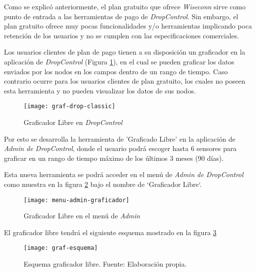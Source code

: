 Como se explicó anteriormente, el plan gratuito que ofrece \textit{Wiseconn} sirve como punto de entrada a las herramientas
de pago de \textit{DropControl}. Sin embargo, el plan gratuito ofrece muy pocas funcionalidades y/o herramientas
implicando poca retención de los usuarios y no se cumplen con las especificaciones comerciales.

Los usuarios clientes de plan de pago tienen a su disposición un graficador en la aplicación de \textit{DropControl} (Figura \ref{fig:graf-drop-classic}), en el cual
se pueden graficar los datos enviados por los nodos en los campos dentro de un rango de tiempo.
Caso contrario ocurre para los usuarios clientes de plan gratuito, los cuales no poseen esta herramienta y
no pueden visualizar los datos de sus nodos.

\begin{figure}[H]
	\centering
	\texttt{[image: graf-drop-classic]}
	\caption{\label{fig:graf-drop-classic} Graficador Libre en \textit{DropControl}}
\end{figure}

Por esto se desarrolla la herramienta de 'Graficado Libre' en la aplicación de \textit{Admin de DropControl},
donde el usuario podrá escoger hasta 6 sensores para graficar en un rango de tiempo máximo de los últimos 3 meses (90 días).

Esta nueva herramienta se podrá acceder en el menú de \textit{Admin de DropControl} como muestra en la figura \ref{fig:menu-admin-graf1} bajo el nombre de `Graficador Libre`. 

\begin{figure}[H]
	\centering
	\texttt{[image: menu-admin-graficador]}
	\caption{\label{fig:menu-admin-graf1} Graficador Libre en el menú de \textit{Admin}}
\end{figure}

El graficador libre tendrá el siguiente esquema mostrado en la figura \ref*{fig:graf-esquema}

\begin{figure}[H]
	\centering
	\texttt{[image: graf-esquema]}
	\caption{\label{fig:graf-esquema} Esquema graficador libre. Fuente: Elaboración propia.}
\end{figure}


